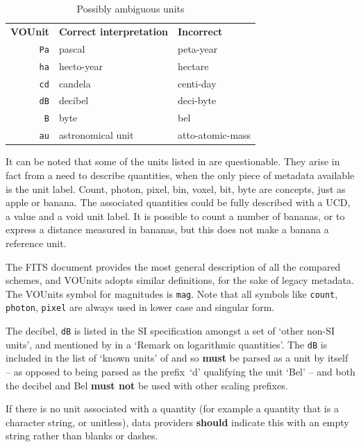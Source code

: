 \documentclass[11pt,notitlepage,onecolumn]{ivoa}
\newcommand*\norm[1]{\textbf{\color{ivoacolor}#1}}
\newcommand{\unit}[1]{\texttt{\small\color{orange}#1}}
\begin{document}
\begin{table}[bht]
\begin{center}
\begin{tabular}{|r|l|l|}
\hline
\textbf{VOUnit}&\textbf{Correct interpretation}&\textbf{Incorrect}\\
\unit{Pa}&pascal&peta-year\\
\unit{ha}&hecto-year&hectare\\
\unit{cd}&candela&centi-day\\
\unit{dB}&decibel&deci-byte\\
\unit{B}&byte&bel\\
\unit{au}&astronomical unit&atto-atomic-mass\\
\hline
\end{tabular}
\end{center}
\caption{\label{tab:ambiguous}Possibly ambiguous units}
\end{table}

It can be noted that some of the units listed in  are 
questionable. They arise in fact from a need to describe quantities, when the only
piece of metadata available is the unit label. Count, photon, pixel, bin, voxel, bit,
byte are concepts, just as apple or banana. The associated quantities could be fully
described with a UCD, a value and a void unit label.
It is possible to count a number of bananas, or to express a distance measured in
bananas, but this does not make a banana a reference unit.

The FITS document provides the most general description of all the compared schemes, 
and VOUnits adopts similar definitions, for the sake of legacy metadata.
The VOUnits symbol for magnitudes is \unit{mag}.
Note that all symbols like \unit{count}, \unit{photon}, \unit{pixel}
are always used in lower case and singular form.

The decibel, \unit{dB} is listed in the SI specification
\citep[Table 8]{si-brochure} amongst a set of `other non-SI units',
and mentioned by \citet[\S0.5]{std:iso80000-3} in a `Remark on
logarithmic quantities'.  The \unit{dB} is included in the list of
`known units' of  and so \norm{must} be parsed as a
unit by itself -- as opposed to being parsed as the prefix~`d'
qualifying the unit `Bel' -- and both the decibel and Bel \norm{must
not} be used with other scaling prefixes.

If there is no unit associated with a quantity (for example a quantity
that is a character string, or unitless), data providers \norm{should}
indicate this with an empty string rather than blanks or dashes.
\end{document}
